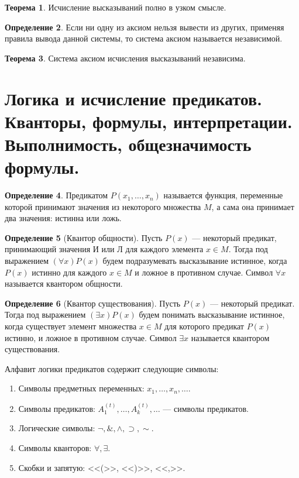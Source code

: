 \documentclass[12pt]{report}
\theoremstyle{definition}
\newtheorem{theorem}{Теорема}[chapter]
\newtheorem{definition}[theorem]{Определение}
\begin{document}
\begin{theorem}
Исчисление высказываний полно в узком смысле.
\end{theorem}

\begin{definition}
Если ни одну из аксиом нельзя вывести из других, применяя правила вывода
данной системы, то система аксиом называется независимой.
\end{definition}

\begin{theorem}
Система аксиом исчисления высказываний независима.
\end{theorem}


\section
{
  Логика и исчисление предикатов.
  Кванторы, формулы, интерпретации.
  Выполнимость, общезначимость формулы.
}

\begin{definition}
Предикатом $P(x_1, \dots, x_n)$ называется функция, переменные которой
принимают значения из некоторого множества $M$, а сама она принимает два
значения: истинна или ложь.
\end{definition}

\begin{definition}[Квантор общности]
Пусть $P(x)$ --- некоторый предикат, принимающий значения
И или Л для каждого элемента $x \in M$.
Тогда под выражением $(\forall x) P(x)$ будем подразумевать высказывание
истинное, когда $P(x)$ истинно для каждого $x \in M$ и ложное в
противном случае. Символ $\forall x$ называется квантором общности.
\end{definition}

\begin{definition}[Квантор существования]
Пусть $P(x)$ --- некоторый предикат. Тогда под выражением
$(\exists x) P(x)$ будем понимать высказывание истинное, когда
существует элемент множества $x \in M$ для которого предикат $P(x)$
истинно, и ложное в противном случае. Символ $\exists x$ называется
квантором существования.
\end{definition}

Алфавит логики предикатов содержит следующие символы:
\begin{enumerate}
\item Символы предметных переменных: $x_1, \dots, x_n, \dots$.
\item Символы предикатов: $A^{(t)}_1, \dots, A^{(t)}_k, \dots$ --- 
  символы предикатов.
\item Логические символы: $\neg, \&, \wedge, \supset, \sim$.
\item Символы кванторов: $\forall, \exists$.
\item Скобки и запятую: <<(>>, <<)>>, <<,>>.
\end{enumerate}
\end{document}

